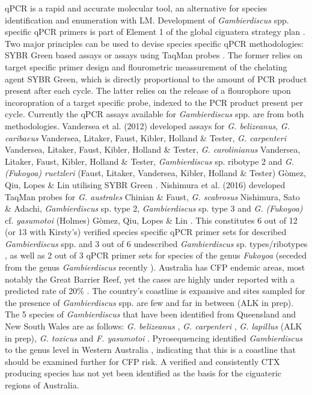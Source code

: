 \documentclass[12pt]{article}
\begin{document}
qPCR is a rapid and accurate molecular tool, an alternative for species identification and enumeration with LM. Development of \emph{Gambierdiscus} spp. specific qPCR primers is part of Element 1 of the global ciguatera strategy plan \citep{globalcig}. Two major principles can be used to devise species specific qPCR methodologies: SYBR Green based assays or assays using TaqMan probes \citep{smith2009advantages}. The former relies on target specific primer design and flourometric meassurement of the chelating agent SYBR Green, which is directly proportional to the amount of PCR product present after each cycle. The latter relies on the release of a flourophore upon incoropration of a target specific probe, indexed to the PCR product present per cycle. Currently the qPCR assays available for \emph{Gambierdiscus} spp. are from both methodologies. Vandersea et al. (2012) developed assays for \emph{G. belizeanus}, \emph{G. caribaeus} Vandersea, Litaker, Faust, Kibler, Holland \& Tester, \emph{G. carpenteri} Vandersea, Litaker, Faust, Kibler, Holland \& Tester, \emph{G. carolinianus} Vandersea, Litaker, Faust, Kibler, Holland \& Tester, \emph{Gambierdiscus} sp. ribotype 2 and \emph{G. (Fukoyoa) ruetzleri} (Faust, Litaker, Vandersea, Kibler, Holland \& Tester) G\`omez, Qiu, Lopes \& Lin utilising SYBR Green \citep{vandersea2012development}. Nishimura et al. (2016) developed TaqMan probes for \emph{G. australes} Chinian \& Faust, \emph{G. scabrosus} Nishimura, Sato \& Adachi, \emph{Gambierdiscus} sp. type 2, \emph{Gambierdiscus} sp. type 3 and \emph{G. (Fukoyoa)} cf. \emph{yasumotoi} (Holmes) G\`omez, Qiu, Lopes \& Lin \citep{nishimura2016quantitative}. This constitutes 6 out of 12 (or 13 with Kirsty's) verified species specific qPCR primer sets for described \emph{Gambierdiscus} spp. and 3 out of 6 undescribed \emph{Gambierdiscus} sp. types/ribotypes , as well as 2 out of 3 qPCR primer sets for species of the genus \emph{Fukoyoa} (seceded from the genus \emph{Gambierdiscus} recently \citep{gomez2015fukuyoa}).
Australia has CFP endemic areas, most notably the Great Barrier Reef, yet the cases are highly under reported with a predicted rate of 20\% \citep{lewis2006ciguatera}. The country's coastline is expansive and sites sampled for the presence of \emph{Gambierdiscus} spp. are few and far in between (ALK in prep). The 5 species of \emph{Gambierdiscus} that have been identified from Queensland and New South Wales are as follows: \emph{G. belizeanus} \citep{murray2014molecular}, \emph{G. carpenteri} \citep{kohli2014high}, \emph{G. lapillus} (ALK in prep), \emph{G. toxicus} \citep{hallegraeff2010algae} and \emph{F. yasumotoi} \citep{murray2014molecular}. Pyrosequencing identified \emph{Gambierdiscus} to the genus level in Western Australia \citep{kohli2014cob} , indicating that this is a coastline that should be examined further for CFP risk. A verified and consistently CTX producing species has not yet been identified as the basis for the ciguateric regions of Australia.
\end{document}
